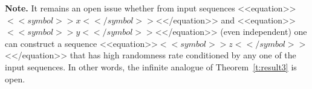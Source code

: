\documentclass[proceedings]{stacs}
\begin{document}
{\bf Note.} It remains an open issue whether from input sequences <<equation>>$<<symbol>>x<</symbol>>$<</equation>> and <<equation>>$<<symbol>>y<</symbol>>$<</equation>> (even independent) one can construct a sequence <<equation>>$<<symbol>>z<</symbol>>$<</equation>> that has high randomness rate conditioned by any one of the input sequences. In other words, the infinite analogue of Theorem~\ref{t:result3} is open.
\end{document}
